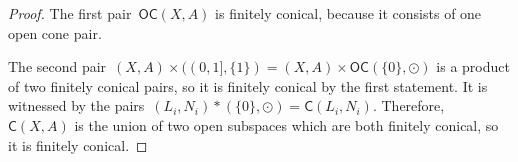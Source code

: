 \documentclass[english,11pt]{article}
\theoremstyle{plain}
\theoremstyle{remark}
\theoremstyle{definition}
\newcommand{\unit}{\odot}%
\newcommand{\C}[1]{\mathsf{C}(#1)}%
\newcommand{\OC}[1]{\mathsf{OC}(#1)}%
\begin{document}
\begin{proof}
The first pair~$\OC{X,A}$ is finitely conical, because it consists of one open cone pair.

The second pair~$(X,A)\times ((0,1],\{1\})=(X,A)\times \OC{\{0\},\unit}$ is a product of two finitely conical pairs, so it is finitely conical by the first statement. It is witnessed by the pairs~$(L_i,N_i)*(\{0\},\unit)=\C{L_i,N_i}$. Therefore,~$\C{X,A}$ is the union of two open subspaces which are both finitely conical, so it is finitely conical.
\end{proof}

\end{document}
